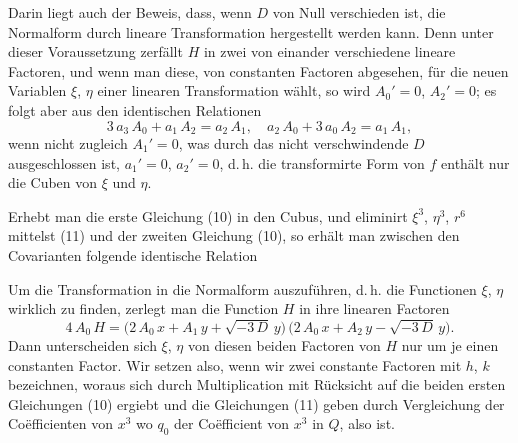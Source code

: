Darin liegt auch der Beweis, dass, wenn $D$ von Null verschieden ist, die Normalform durch lineare Transformation hergestellt werden kann. Denn unter dieser Voraussetzung zerfällt $H$ in zwei von einander verschiedene lineare Factoren, und wenn man diese, von constanten Factoren abgesehen, für die neuen Variablen $\xi$, $\eta$ einer linearen Transformation wählt, so wird $A_0' = 0$, $A_2' = 0$; es folgt aber aus den identischen Relationen
\[
3\,a_3\,A_0 + a_1\,A_2 = a_2\,A_1,\quad a_2\,A_0 + 3\,a_0\,A_2 = a_1\,A_1,
\]
wenn nicht zugleich $A_1' = 0$, was durch das nicht verschwindende $D$ ausgeschlossen ist, $a_1' = 0$, $a_2' = 0$, d.\,h. die transformirte Form von $f$ enthält nur die Cuben von $\xi$ und $\eta$.

Erhebt man die erste Gleichung (10) in den Cubus, und eliminirt $\xi^3$, $\eta^3$, $r^6$ mittelst (11) und der zweiten Gleichung (10), so erhält man zwischen den Covarianten folgende identische Relation

Um die Transformation in die Normalform auszuführen, d.\,h. die Functionen $\xi$, $\eta$ wirklich zu finden, zerlegt man die Function $H$ in ihre linearen Factoren
\[
4\,A_0\,H = \bigl(2\,A_0\,x + A_1\,y + \sqrt{-3\,D}\,y\bigr)\,\bigl(2\,A_0\,x + A_2\,y - \sqrt{-3\,D}\,y\bigr).
\]
Dann unterscheiden sich $\xi$, $\eta$ von diesen beiden Factoren von $H$ nur um je einen constanten Factor. Wir setzen also, wenn wir zwei constante Factoren mit $h$, $k$ bezeichnen,
woraus sich durch Multiplication mit Rücksicht auf die beiden ersten Gleichungen (10) ergiebt
und die Gleichungen (11) geben durch Vergleichung der Co\"efficienten von $x^3$
wo $q_0$ der Co\"efficient von $x^3$ in $Q$, also
ist.
